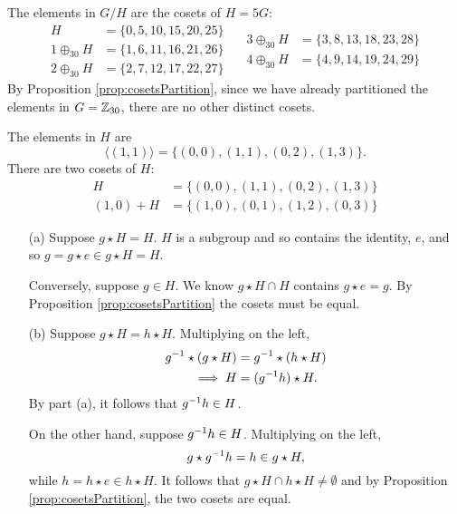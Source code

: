 \documentclass[../algebraNotesMSRI-UP2016.tex]{subfiles}
\begin{document}
\begin{frame}
The elements in $G/H$ are the cosets of $H=5G$:
\[
\begin{aligned}
H &= \{0,5,10,15,20,25\} \\
1\oplus_{30}H &= \{1,6,11,16,21,26\} \\
2\oplus_{30}H &= \{2,7,12,17,22,27\}
\end{aligned} \quad
\begin{aligned}
3\oplus_{30}H &= \{3,8,13,18,23,28\} \\
4\oplus_{30}H &= \{4,9,14,19,24,29\}
\end{aligned} 
\]
By Proposition \ref{prop:cosetsPartition}, since we have already partitioned the elements in $G=\mathbb Z_{30}$, there are no other distinct cosets.

\smallGap
{}
The elements in $H$ are
\[
\langle (1,1)\rangle = \{(0,0),(1,1),(0,2),(1,3)\}.
\]
There are two cosets of $H$:
\begin{align*}
H &= \{(0,0),(1,1),(0,2),(1,3)\} \\
(1,0)+H &= \{(1,0),(0,1),(1,2),(0,3)\}
\end{align*}
\end{frame}

\begin{frame}
\begin{itemize}
\item[(a)] Suppose $g\star H=H$.  $H$ is a subgroup and so contains the identity, $e$, and so $g=g\star e \in g\star H=H$.  

\smallGap
Conversely, suppose $g\in H$.  We know $g\star H\cap H$ contains $g\star e=g$.  By Proposition \ref{prop:cosetsPartition} the cosets must be equal.

\smallGap
\item[(b)] Suppose $g\star H=h\star H$.  Multiplying on the left, 
\begin{align*}
g^{-1}\star(g\star H) &= g^{-1}\star(h\star H) \\
\implies H &= (g^{-1}h)\star H. 
\end{align*}
By part {(a)}, it follows that $g^{-1}h\in H$.

\smallGap
On the other hand, suppose $g^{-1}h\in H$.  Multiplying on the left,
\[
g\star g^{-1}h=h\in g\star H,
\]
while $h=h\star e\in h\star H$.  It follows that $g\star H\cap h\star H\neq \emptyset$ and by Proposition \ref{prop:cosetsPartition}, the two cosets are equal.
\end{itemize}
\end{frame}
\end{document}
